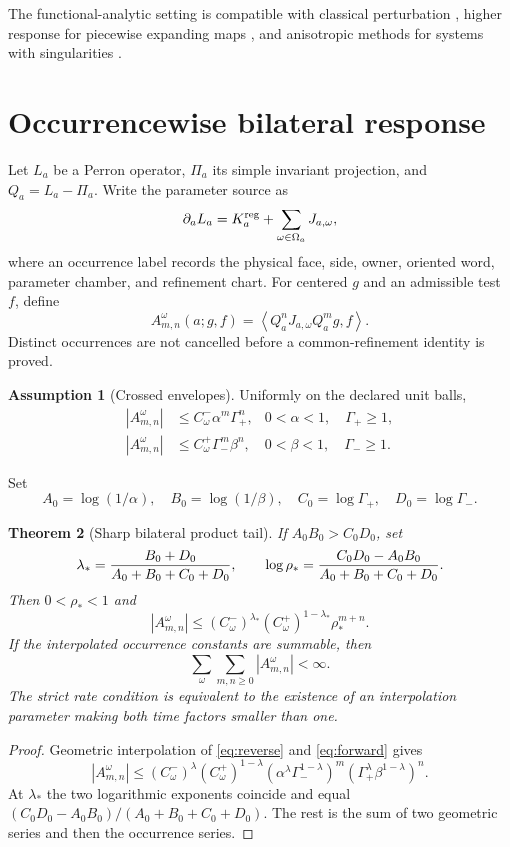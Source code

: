 \documentclass[11pt,reqno]{amsart}
\newtheorem{theorem}{Theorem}[section]
\theoremstyle{definition}
\newtheorem{assumption}[theorem]{Assumption}
\theoremstyle{remark}
\newcommand{\abs}[1]{\left\lvert #1\right\rvert}
\newcommand{\pair}[2]{\left\langle #1,#2\right\rangle}
\begin{document}
The functional-analytic setting is compatible with classical perturbation
\cite{Kato1995,KellerLiverani1999}, higher response for piecewise expanding
maps \cite{BaladiSmania2008}, and anisotropic methods for systems with
singularities \cite{DemersLiverani2008,BaladiDemersLiverani2018}.

\section{Occurrencewise bilateral response}\label{sec:bilateral}
Let $L_a$ be a Perron operator, $\Pi_a$ its simple invariant projection, and
$Q_a=L_a-\Pi_a$.  Write the parameter source as
\[
 \partial_aL_a=K_a^{\rm reg}+\sum_{\omega\in\Omega_a}J_{a,\omega},
\]
where an occurrence label records the physical face, side, owner, oriented
word, parameter chamber, and refinement chart.  For centered $g$ and an
admissible test $f$, define
\[
 A_{m,n}^{\omega}(a;g,f)=
 \pair{Q_a^nJ_{a,\omega}Q_a^m g}{f}.
\]
Distinct occurrences are not cancelled before a common-refinement identity is
proved.

\begin{assumption}[Crossed envelopes]\label{ass:crossed}
Uniformly on the declared unit balls,
\begin{align}
 \abs{A_{m,n}^{\omega}}
 &\le C_\omega^-\alpha^m\Gamma_+^n,
 &0<\alpha<1,\quad\Gamma_+\ge1,\label{eq:reverse}\\
 \abs{A_{m,n}^{\omega}}
 &\le C_\omega^+\Gamma_-^m\beta^n,
 &0<\beta<1,\quad\Gamma_-\ge1.\label{eq:forward}
\end{align}
\end{assumption}
Set
\[
 A_0=\log(1/\alpha),\quad B_0=\log(1/\beta),\quad
 C_0=\log\Gamma_+,\quad D_0=\log\Gamma_-.
\]

\begin{theorem}[Sharp bilateral product tail]\label{thm:bilateral}
If $A_0B_0>C_0D_0$, set
\[
 \lambda_*={B_0+D_0\over A_0+B_0+C_0+D_0},
 \qquad
 \log\rho_*={C_0D_0-A_0B_0\over A_0+B_0+C_0+D_0}.
\]
Then $0<\rho_*<1$ and
\[
 \abs{A_{m,n}^{\omega}}
 \le(C_\omega^-)^{\lambda_*}(C_\omega^+)^{1-\lambda_*}
 \rho_*^{m+n}.
\]
If the interpolated occurrence constants are summable, then
\[
 \sum_\omega\sum_{m,n\ge0}\abs{A_{m,n}^{\omega}}<\infty.
\]
The strict rate condition is equivalent to the existence of an interpolation
parameter making both time factors smaller than one.
\end{theorem}

\begin{proof}
Geometric interpolation of \eqref{eq:reverse} and \eqref{eq:forward} gives
\[
 \abs{A_{m,n}^{\omega}}
 \le(C_\omega^-)^\lambda(C_\omega^+)^{1-\lambda}
 (\alpha^\lambda\Gamma_-^{1-\lambda})^m
 (\Gamma_+^\lambda\beta^{1-\lambda})^n.
\]
At $\lambda_*$ the two logarithmic exponents coincide and equal
$(C_0D_0-A_0B_0)/(A_0+B_0+C_0+D_0)$.  The rest is the sum of two geometric
series and then the occurrence series.
\end{proof}
\end{document}
